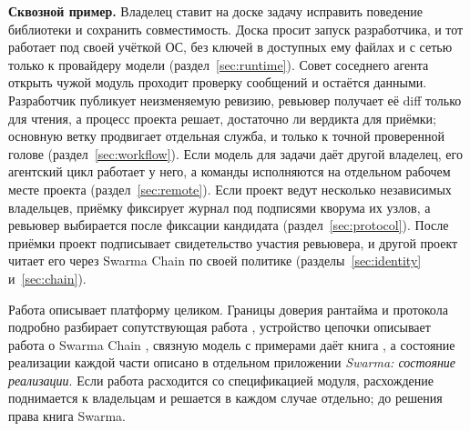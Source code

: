 \documentclass[10pt,a4paper]{article}
\begin{document}
\textbf{Сквозной пример.} Владелец ставит на доске задачу исправить поведение библиотеки и сохранить совместимость. Доска просит запуск разработчика, и тот работает под своей учёткой ОС, без ключей в доступных ему файлах и с сетью только к провайдеру модели (раздел~\ref{sec:runtime}). Совет соседнего агента открыть чужой модуль проходит проверку сообщений и остаётся данными. Разработчик публикует неизменяемую ревизию, ревьювер получает её diff только для чтения, а процесс проекта решает, достаточно ли вердикта для приёмки; основную ветку продвигает отдельная служба, и только к точной проверенной голове (раздел~\ref{sec:workflow}). Если модель для задачи даёт другой владелец, его агентский цикл работает у него, а команды исполняются на отдельном рабочем месте проекта (раздел~\ref{sec:remote}). Если проект ведут несколько независимых владельцев, приёмку фиксирует журнал под подписями кворума их узлов, а ревьювер выбирается после фиксации кандидата (раздел~\ref{sec:protocol}). После приёмки проект подписывает свидетельство участия ревьювера, и другой проект читает его через Swarma Chain по своей политике (разделы~\ref{sec:identity} и~\ref{sec:chain}).

Работа описывает платформу целиком. Границы доверия рантайма и протокола подробно разбирает сопутствующая работа \cite{swarmatrust}, устройство цепочки описывает работа о Swarma Chain \cite{swarmachain}, связную модель с примерами даёт книга \cite{swarmabook}, а состояние реализации каждой части описано в отдельном приложении \emph{Swarma: состояние реализации}. Если работа расходится со спецификацией модуля, расхождение поднимается к владельцам и решается в каждом случае отдельно; до решения права книга Swarma.
\end{document}
